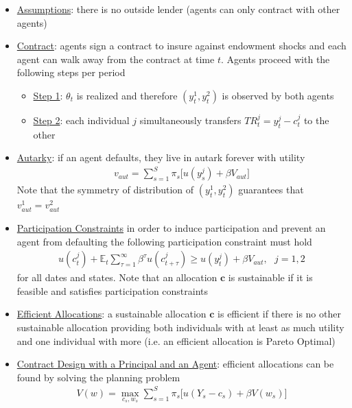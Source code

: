 \documentclass{article}
\begin{document}
\begin{itemize}
    \item  \underline{Assumptions}: there is no outside lender (agents can only contract with other agents)
    \item \underline{Contract}: agents sign a contract to insure against endowment shocks and each agent can walk away from the contract at time $t$. Agents proceed with the following steps per period
    \begin{itemize}
        \item  \underline{Step 1}: $\theta_{t}$ is realized and therefore $(y_{t}^{1}, y_{t}^{2})$ is observed by both agents
        \item  \underline{Step 2}: each individual $j$ simultaneously transfers $TR_{t}^{j} = y_{t}^{j} - c_{t}^{j}$ to the other
    \end{itemize}
    \item  \underline{Autarky}: if an agent defaults, they live in autark forever with utility
    \begin{gather*}
        v_{aut} = \sum_{s=1}^{S} \pi_{s} \big[ u(y_{s}^{j}) + \beta V_{aut} \big]
    \end{gather*}
    Note that the symmetry of distribution of $(y_{t}^{1}, y_{t}^{2})$ guarantees that $v_{aut}^{1} = v_{aut}^{2}$
    \item  \underline{Participation Constraints} in order to induce participation and prevent an agent from defaulting the following participation constraint must hold
    \begin{gather*}
        u(c_{t}^{j}) + \mathbb{E}_{t}\sum_{\tau = 1}^{\infty} \beta^{\tau}u(c_{t+\tau}^{j}) \geq u(y_{t}^{j}) + \beta V_{aut}, \ \ \ j = 1,2
    \end{gather*}
    for all dates and states.
    Note that an allocation $\textbf{c}$ is sustainable if it is feasible and satisfies participation constraints
    \item  \underline{Efficient Allocations}: a sustainable allocation $\textbf{c}$ is efficient if there is no other sustainable allocation providing both individuals with at least as much utility and one individual with more (i.e. an efficient allocation is Pareto Optimal)
    \item  \underline{Contract Design with a Principal and an Agent}: efficient allocations can be found by solving the planning problem
    \begin{gather*}
        V(w) = \max_{c_{s}, w_{s}} \sum_{s=1}^{S} \pi_{s} \big[u(Y_{s} - c_{s}) + \beta V(w_{s})\big] \\

\end{gather*}
\end{itemize}
\end{document}
